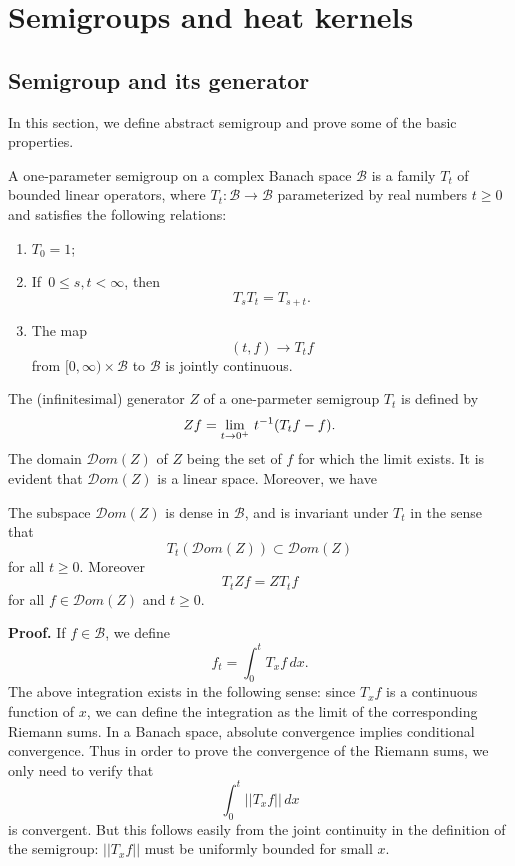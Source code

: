 \chapter{Semigroups and heat kernels}\label{Semi_group}

\section{Semigroup and its generator}\label{Semi_group_and_generator}

In this section, we define  abstract semigroup and prove some of  the  basic properties. 

\begin{definition}
A one-parameter semigroup on a complex Banach space $\mathcal B$ is a  family $T_t$ of bounded linear operators, where $T_t: \mathcal B\to\mathcal B$ parameterized by real  numbers $t\geq 0$ and satisfies the following relations:
\begin{enumerate}
\item $T_0=1$;
\item If  \,$0\leq s,t<\infty$, then
\[
T_sT_t=T_{s+t}.
\]
\item The map
\[
(t,f)\to T_tf
\]
from $[0,\infty)\times\mathcal B$ to $\mathcal B$ is jointly continuous.
\end{enumerate}
\end{definition}



The (infinitesimal) generator $Z$ of a one-parmeter semigroup $T_t$ is defined by
\[
Zf=\lim_{t\to 0^+}\, t^{-1}(T_tf-f).
\]
The domain ${\mathcal Dom}(Z)$ of $Z$ being the set of $f$ for which the limit exists. It is evident that  ${\mathcal Dom}(Z)$  is a linear space. Moreover, we have

\begin{lemma}
The subspace  ${\mathcal Dom}(Z)$ is dense in $\mathcal B$, and is invariant under $T_t$ in the sense that
\[
T_t( {\mathcal Dom}(Z) )\subset  {\mathcal Dom}(Z)
\]
for all $t\geq 0$. Moreover
\[
T_tZf=ZT_t f
\]
for all $f\in  {\mathcal Dom}(Z)$ and $t\geq 0$.
\end{lemma}


{\bf Proof.} If $f\in\mathcal B$, we define
\[
f_t=\int_0^t T_xf\, dx.
\]
The above integration  exists in the following sense: 
since $T_xf$ is a continuous function of $x$, we can define
the integration as the limit of the corresponding Riemann sums.
In a Banach space, absolute convergence implies conditional convergence. Thus in order to prove the convergence of the Riemann sums, we only need to verify  that 
\[
\int_0^t||T_xf||\, dx
\]
is convergent. But this follows easily from the joint continuity in the definition of the semigroup: $||T_xf||$ must be uniformly bounded for small $x$.

